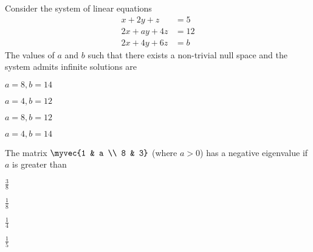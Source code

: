 \item
Consider the system of linear equations
\begin{align*}
x + 2y + z &= 5 \\
2x + a y + 4z &= 12 \\
2x + 4y + 6z &= b
\end{align*}
The values of $a$ and $b$ such that there exists a non-trivial null space and the system admits infinite solutions are
\hfill{}
\begin{enumerate}
\begin{multicols}{4}
\item $a=8, b=14$
\item $a=4, b=12$
\item $a=8, b=12$
\item $a=4, b=14$
\end{multicols}
\end{enumerate}
\item
The matrix $\myvec{1 & a \\ 8 & 3}$ (where $a > 0$) has a negative eigenvalue if $a$ is greater than

\hfill{}
\begin{enumerate}
\begin{multicols}{4}
\item $\frac{3}{8}$
\item $\frac{1}{8}$
\item $\frac{1}{4}$
\item $\frac{1}{5}$
\end{multicols}
\end{enumerate}
